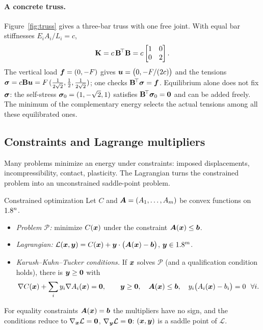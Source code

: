 \paragraph{A concrete truss.}
%
Figure~\ref{fig:truss} gives a three-bar truss with one free joint. With
equal bar stiffnesses $E_iA_i/L_i=c$,
\[
  \mathbf{K}=c\,\mathbf{B}^{\!\top}\mathbf{B}=c\begin{bmatrix}1&0\\0&2\end{bmatrix}.
\]
The vertical load $\bm{f}=(0,-F)$ gives $\bm{u}=\bigl(0,-F/(2c)\bigr)$ and the tensions
$\bm{\sigma}=c\mathbf{B}\bm{u}=F\,(\tfrac1{2\sqrt2},\tfrac12,\tfrac1{2\sqrt2})$;
one checks $\mathbf{B}^{\!\top}\bm{\sigma}=\bm{f}$. Equilibrium alone does not fix
$\bm{\sigma}$: the self-stress $\bm{\sigma}_0=(1,-\sqrt2,1)$ satisfies
$\mathbf{B}^{\!\top}\bm{\sigma}_0=\bm{0}$ and can be added freely. The minimum of the
complementary energy selects the actual tensions among all these
equilibrated ones.

\subsection{Constraints and Lagrange multipliers}\label{sec:var-lagrange}
%
Many problems minimize an energy under constraints: imposed displacements,
incompressibility, contact, plasticity. The Lagrangian turns the constrained
problem into an unconstrained saddle-point problem.

\begin{gbox}{Constrained optimization}
%
Let $C$ and $\bm{A}=(A_1,\dots,A_m)$ be convex functions on $1.8^n$.
\begin{itemize}
\item \emph{Problem $\mathcal P$:} minimize $C(\bm{x})$ under the constraint
$\bm{A}(\bm{x})\le\bm{b}$.
\item \emph{Lagrangian:}
$\mathcal L(\bm{x},\bm{y})=C(\bm{x})+\bm{y}\cdot\bigl(\bm{A}(\bm{x})-\bm{b}\bigr)$,
$\bm{y}\in1.8^m$.
\item \emph{Karush--Kuhn--Tucker conditions.} If $\bm{x}$ solves $\mathcal P$
(and a qualification condition holds), there is $\bm{y}\ge\bm{0}$ with
\[
  \nabla C(\bm{x})+\sum_iy_i\nabla A_i(\bm{x})=\bm{0},\qquad
  \bm{y}\ge\bm{0},\quad\bm{A}(\bm{x})\le\bm{b},\quad
  y_i\bigl(A_i(\bm{x})-b_i\bigr)=0\ \ \forall i .
\]
\end{itemize}
For equality constraints $\bm{A}(\bm{x})=\bm{b}$ the multipliers have no sign,
and the conditions reduce to $\nabla_{\bm{x}}\mathcal L=\bm{0}$,
$\nabla_{\bm{y}}\mathcal L=\bm{0}$: $(\bm{x},\bm{y})$ is a saddle point of
$\mathcal L$.
\end{gbox}
